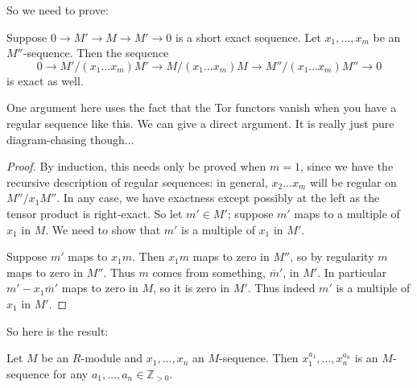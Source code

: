 So we need to prove:
\begin{lemma} 
Suppose $0 \to M' \to M \to M' \to 0$ is a short exact sequence. Let $x_1,
\dots, x_m$ be an $M''$-sequence. Then the sequence
\[ 0 \to M'/(x_1 \dots x_m)M' \to M/(x_1 \dots x_m)M \to   M''/(x_1 \dots
x_m)M'' \to 0\]
is exact as well.
\end{lemma} 
One argument here uses the fact that the Tor functors vanish when you have a
regular sequence like this. We can give a direct argument. It is really just
pure diagram-chasing though...
\begin{proof} 
By induction, this needs only be proved when $m=1$, since we have the recursive
description of regular sequences: in general, $x_2 \dots x_m$ will be regular
on $M''/x_1 M''$. 
In any case, we have exactness except possibly at the left as the tensor
product is right-exact. So let $m' \in M'$; suppose $m'$ maps to a multiple of
$x_1$ in $M$. We need to show that $m'$ is a multiple of $x_1$ in $M'$. 

Suppose $m'$ maps to $x_1 m$. Then $x_1m$ maps to zero in $M''$, so by regularity $m$
maps to zero in $M''$. Thus $m$ comes from something, $\overline{m}'$, in $M'$. In particular
$m' - x_1 \overline{m}'$ maps to zero in $M$, so it is zero in $M'$. Thus
indeed $m'$ is a multiple of $x_1$ in $M'$.
\end{proof} 
So here is the result:

\begin{proposition} 
Let $M$ be an $R$-module and $x_1, \dots, x_n$ an $M$-sequence. Then $x_1^{a_1}
,\dots, x_n^{a_n}$ is an $M$-sequence for any $a_1, \dots, a_n \in
\mathbb{Z}_{>0}$.
\end{proposition} 

